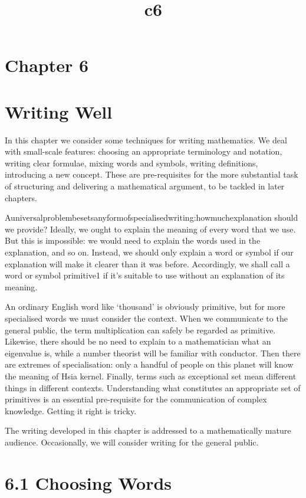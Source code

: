 \documentclass[11pt]{article}
\title{c6}
\date{}
\theoremstyle{plain}
\theoremstyle{definition}
\begin{document}
\maketitle

\section{Chapter 6}

\section{Writing Well}

In this chapter we consider some techniques for writing mathematics. We deal with small-scale features: choosing an appropriate terminology and notation, writing clear formulae, mixing words and symbols, writing definitions, introducing a new concept. These are pre-requisites for the more substantial task of structuring and delivering a mathematical argument, to be tackled in later chapters.

Auniversalproblembesetsanyformofspecialisedwriting:howmuchexplanation should we provide? Ideally, we ought to explain the meaning of every word that we use. But this is impossible: we would need to explain the words used in the explanation, and so on. Instead, we should only explain a word or symbol if our explanation will make it clearer than it was before. Accordingly, we shall call a word or symbol primitive1 if it's suitable to use without an explanation of its meaning.

An ordinary English word like `thousand' is obviously primitive, but for more specialised words we must consider the context. When we communicate to the general public, the term multiplication can safely be regarded as primitive. Likewise, there should be no need to explain to a mathematician what an eigenvalue is, while a number theorist will be familiar with conductor. Then there are extremes of specialisation: only a handful of people on this planet will know the meaning of Hsia kernel. Finally, terms such as exceptional set mean different things in different contexts. Understanding what constitutes an appropriate set of primitives is an essential pre-requisite for the communication of complex knowledge. Getting it right is tricky.

The writing developed in this chapter is addressed to a mathematically mature audience. Occasionally, we will consider writing for the general public.

\section{6.1 Choosing Words}
\end{document}
